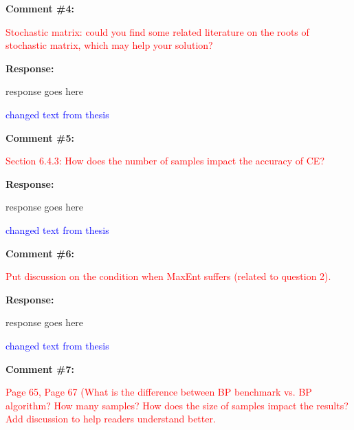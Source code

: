 \documentclass[journal]{IEEEtran}
\begin{document}
\vspace{30pt}
\textbf{Comment \#4:}
\begin{adjustwidth}{2.5em}{0pt}
\singlespacing \vspace{-10pt}
\textcolor{red}{Stochastic matrix: could you find some related literature on the roots of stochastic matrix, which may help your solution?}
\end{adjustwidth}

\vspace{10pt}
\textbf{Response:}
\begin{adjustwidth}{2.5em}{0pt}
response goes here

\vspace{10pt}
\noindent\textcolor{blue}{changed text from thesis}
\end{adjustwidth}


\vspace{30pt}
\textbf{Comment \#5:}
\begin{adjustwidth}{2.5em}{0pt}
\singlespacing \vspace{-10pt}
\textcolor{red}{Section 6.4.3: How does the number of samples impact the accuracy of CE?}
\end{adjustwidth}

\vspace{10pt}
\textbf{Response:}
\begin{adjustwidth}{2.5em}{0pt}
response goes here

\vspace{10pt}
\noindent\textcolor{blue}{changed text from thesis}
\end{adjustwidth}


\vspace{30pt}
\textbf{Comment \#6:}
\begin{adjustwidth}{2.5em}{0pt}
\singlespacing \vspace{-10pt}
\textcolor{red}{Put discussion on the condition when MaxEnt suffers (related to question 2).}
\end{adjustwidth}

\vspace{10pt}
\textbf{Response:}
\begin{adjustwidth}{2.5em}{0pt}
response goes here

\vspace{10pt}
\noindent\textcolor{blue}{changed text from thesis}
\end{adjustwidth}


\vspace{30pt}
\textbf{Comment \#7:}
\begin{adjustwidth}{2.5em}{0pt}
\singlespacing \vspace{-10pt}
\textcolor{red}{Page 65, Page 67 (What is the difference between BP benchmark vs. BP algorithm? How many samples? How does the size of samples impact the results? Add discussion to help readers understand better.}
\end{adjustwidth}
\end{document}
